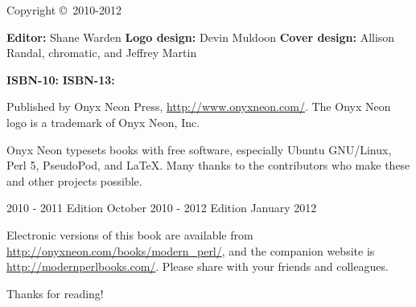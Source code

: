 \thispagestyle{empty}

\huge{\booktitle}
\newline
\large{\booksubtitle}
\newline
\newline
\normalsize

Copyright \copyright~2010-2012 \bookauthor

\vfill
\textbf{Editor:} Shane Warden\newline
\textbf{Logo design:} Devin Muldoon\newline
\textbf{Cover design:} Allison Randal, chromatic, and Jeffrey Martin

\textbf{ISBN-10:} \bookisbnten\newline
\textbf{ISBN-13:} \bookisbnthirteen

Published by Onyx Neon Press, \url{http://www.onyxneon.com/}.
The Onyx Neon logo is a trademark of Onyx Neon, Inc.

Onyx Neon typesets books with free software, especially Ubuntu GNU/Linux, Perl
5, PseudoPod, and \LaTeX. Many thanks to the contributors who make these and
other projects possible.

2010 - 2011 Edition October 2010 - 2012 Edition January 2012

Electronic versions of this book are available from
\url{http://onyxneon.com/books/modern_perl/}, and the companion website is
\url{http://modernperlbooks.com/}. Please share with your friends and
colleagues.

Thanks for reading!
